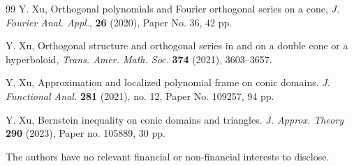 \documentclass{amsart}
\theoremstyle{remark}
\begin{document}
\begin{thebibliography}{99}
       Y. Xu,
       Orthogonal polynomials and Fourier orthogonal series on a cone,
       \textit{J. Fourier Anal. Appl.}, \textbf{26} (2020), Paper No. 36, 42 pp.

{}
       Y. Xu,
       Orthogonal structure and orthogonal series in and on a double cone or a hyperboloid,
       \textit{Trans. Amer. Math. Soc.} \textbf{374} (2021), 3603--3657.

       Y. Xu,
       Approximation and localized polynomial frame on conic domains.
       \textit{J. Functional Anal.} \textbf{281} (2021), no. 12, Paper No. 109257, 94 pp.

       Y. Xu, Bernstein inequality on conic domains and triangles. 
       \textit{J. Approx. Theory} \textbf{290} (2023), Paper no. 105889, 30 pp. 

\end{thebibliography}

\bigskip
 

The authors have no relevant financial or non-financial interests to disclose.
\end{document}
